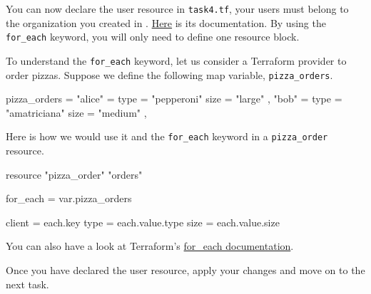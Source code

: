 You can now declare the user resource in \texttt{task4.tf}, your users must belong to the organization you created in .
\href{https://intuinewin.github.io/taikun-docs/resources/user.html}{Here} is its documentation.
By using the \texttt{for\_each} keyword, you will only need to define one resource block.

\begin{tip}
  To understand the \texttt{for\_each} keyword, let us consider a Terraform provider to order pizzas.
  Suppose we define the following map variable, \texttt{pizza\_orders}.
  \begin{tf}
pizza_orders = {
  "alice" = {
    type = "pepperoni"
    size = "large"
  },
  "bob" = {
    type = "amatriciana"
    size = "medium"
  },
}
  \end{tf}
  Here is how we would use it and the \texttt{for\_each} keyword in a \texttt{pizza\_order} resource.
  \begin{tf}
resource "pizza_order" "orders" {
  for_each = var.pizza_orders

  client = each.key
  type   = each.value.type
  size   = each.value.size
}
  \end{tf}

  You can also have a look at Terraform's \href{https://www.terraform.io/docs/language/meta-arguments/for_each.html}{for\_each documentation}.
\end{tip}

Once you have declared the user resource, apply your changes and move on to the next task.
